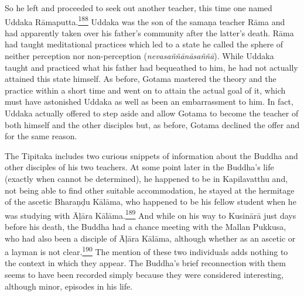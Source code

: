 So he left and proceeded to seek out another teacher, this time one
named Uddaka
Rāmaputta.\label{footprints_split_009.html_fnref188}\hyperref[footprints_split_024.htmlux5cux23fn188]{\textsuperscript{188}}
Uddaka was the son of the samaṇa teacher Rāma and had apparently taken
over his father's community after the latter's death. Rāma had taught
meditational practices which led to a state he called the sphere of
neither perception nor non-perception (\emph{nevasaññānāsaññā}). While
Uddaka taught and practiced what his father had bequeathed to him, he
had not actually attained this state himself. As before, Gotama mastered
the theory and the practice within a short time and went on to attain
the actual goal of it, which must have astonished Uddaka as well as been
an embarrassment to him. In fact, Uddaka actually offered to step aside
and allow Gotama to become the teacher of both himself and the other
disciples but, as before, Gotama declined the offer and for the same
reason.

The Tipitaka includes two curious snippets of information about the
Buddha and other disciples of his two teachers. At some point later in
the Buddha's life (exactly when cannot be determined), he happened to be
in Kapilavatthu and, not being able to find other suitable
accommodation, he stayed at the hermitage of the ascetic Bharaṇḍu
Kālāma, who happened to be his fellow student when he was studying with
Āḷāra
Kālāma.\label{footprints_split_009.html_fnref189}\hyperref[footprints_split_024.htmlux5cux23fn189]{\textsuperscript{189}}
And while on his way to Kusinārā just days before his death, the Buddha
had a chance meeting with the Mallan Pukkusa, who had also been a
disciple of Āḷāra Kālāma, although whether as an ascetic or a layman is
not
clear.\label{footprints_split_009.html_fnref190}\hyperref[footprints_split_024.htmlux5cux23fn190]{\textsuperscript{190}}
The mention of these two individuals adds nothing to the context in
which they appear. The Buddha's brief reconnection with them seems to
have been recorded simply because they were considered interesting,
although minor, episodes in his life.

